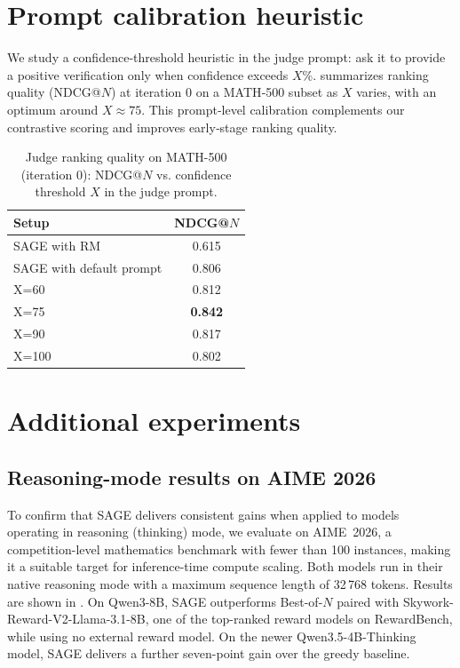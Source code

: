 \documentclass{article}
\theoremstyle{plain}
\theoremstyle{definition}
\theoremstyle{remark}
\newcommand{\method}{SAGE} %
\begin{document}
\section {Prompt calibration heuristic}
\noindent We study a confidence‑threshold heuristic in the judge prompt: ask it to provide a positive verification only when confidence exceeds \(X\)\%.  summarizes ranking quality (NDCG@\(N\)) at iteration 0 on a MATH‑500 subset as \(X\) varies, with an optimum around \(X\!\approx\!75\). This prompt‑level calibration complements our contrastive scoring and improves early‑stage ranking quality.
\begin{table}[t]
\caption{Judge ranking quality on MATH-500 (iteration 0): NDCG@\(N\) vs. confidence threshold \(X\) in the judge prompt.}
\label{tab:judge-threshold-ndcg}
\vskip 0.1in
\centering
\begin{small}
\begin{sc}
\begin{tabular}{lc}
\toprule
Setup & NDCG@\(N\) \\
\midrule
SAGE with RM & 0.615 \\
SAGE with default prompt & 0.806 \\
X=60 & 0.812 \\
X=75 & \textbf{0.842} \\
X=90 & 0.817 \\
X=100 & 0.802 \\
\bottomrule
\end{tabular}
\end{sc}
\end{small}
\vskip -0.25in
\end{table}


\begingroup
\color{blue}

\section{Additional experiments}
\label{app:additional-experiments}

\subsection{Reasoning-mode results on AIME 2026}

To confirm that \method{} delivers consistent gains when applied to models operating in reasoning (thinking) mode, we evaluate on AIME~2026, a competition-level mathematics benchmark with fewer than 100 instances, making it a suitable target for inference-time compute scaling. Both models run in their native reasoning mode with a maximum sequence length of 32\,768 tokens. Results are shown in . On Qwen3-8B, \method{} outperforms Best-of-\(N\) paired with Skywork-Reward-V2-Llama-3.1-8B, one of the top-ranked reward models on RewardBench, while using no external reward model. On the newer Qwen3.5-4B-Thinking model, \method{} delivers a further seven-point gain over the greedy baseline.
\end{document}
